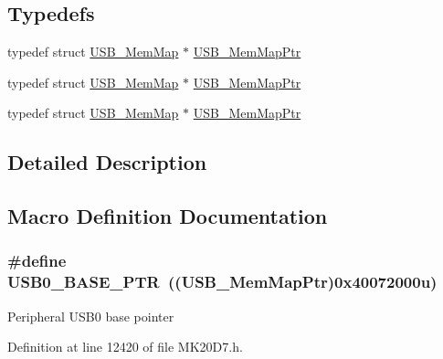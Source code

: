 \subsection*{Typedefs}
\begin{DoxyCompactItemize}
\item 
typedef struct \hyperlink{struct_u_s_b___mem_map}{U\+S\+B\+\_\+\+Mem\+Map} $\ast$ \hyperlink{group___u_s_b___peripheral_gaabd989a49827dc34abb5de32732f4125}{U\+S\+B\+\_\+\+Mem\+Map\+Ptr}
\item 
typedef struct \hyperlink{struct_u_s_b___mem_map}{U\+S\+B\+\_\+\+Mem\+Map} $\ast$ \hyperlink{group___u_s_b___peripheral_gaabd989a49827dc34abb5de32732f4125}{U\+S\+B\+\_\+\+Mem\+Map\+Ptr}
\item 
typedef struct \hyperlink{struct_u_s_b___mem_map}{U\+S\+B\+\_\+\+Mem\+Map} $\ast$ \hyperlink{group___u_s_b___peripheral_gaabd989a49827dc34abb5de32732f4125}{U\+S\+B\+\_\+\+Mem\+Map\+Ptr}
\end{DoxyCompactItemize}


\subsection{Detailed Description}


\subsection{Macro Definition Documentation}
\subsubsection[{\texorpdfstring{U\+S\+B0\+\_\+\+B\+A\+S\+E\+\_\+\+P\+TR}{USB0_BASE_PTR}}]{\setlength{\rightskip}{0pt plus 5cm}\#define U\+S\+B0\+\_\+\+B\+A\+S\+E\+\_\+\+P\+TR~(({\bf U\+S\+B\+\_\+\+Mem\+Map\+Ptr})0x40072000u)}\hypertarget{group___u_s_b___peripheral_ga598ff5eb20a0551af232710b3f27640a}{}\label{group___u_s_b___peripheral_ga598ff5eb20a0551af232710b3f27640a}
Peripheral U\+S\+B0 base pointer 

Definition at line 12420 of file M\+K20\+D7.\+h.

